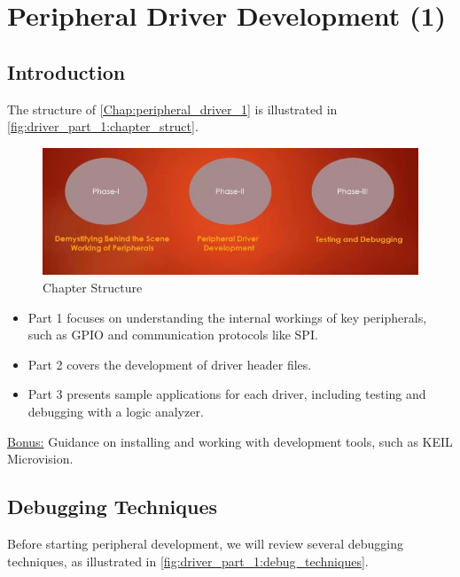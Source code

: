 \chapter{Peripheral Driver Development (1)}
\label{Chap:peripheral_driver_1}

\section{Introduction}

The structure of \autoref{Chap:peripheral_driver_1} is illustrated in \autoref{fig:driver_part_1:chapter_struct}.

\begin{figure}[h]
\centering
\includegraphics[scale=0.5]{Figures/driver_part_1/chapter_struct}
\caption{Chapter Structure}
\label{fig:driver_part_1:chapter_struct}
\end{figure}

\begin{itemize}
    \item Part 1 focuses on understanding the internal workings of key peripherals, such as GPIO and communication protocols like SPI.
    \item Part 2 covers the development of driver header files.
    \item Part 3 presents sample applications for each driver, including testing and debugging with a logic analyzer.
\end{itemize}

\underline{Bonus:} Guidance on installing and working with development tools, such as KEIL Microvision.

\newpage
\section{Debugging Techniques}

Before starting peripheral development, we will review several debugging techniques, as illustrated in \autoref{fig:driver_part_1:debug_techniques}.

